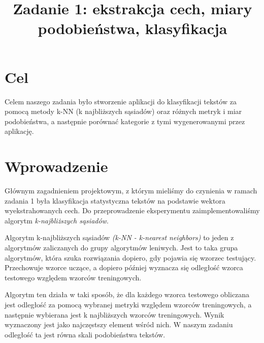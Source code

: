 \documentclass{classrep}
\author{
  \studentinfo{Radosław Grela}{216769} \and
  \studentinfo{Jakub Wąchała}{216914} 
}
\title{Zadanie 1: ekstrakcja cech, miary podobieństwa, klasyfikacja}
\begin{document}
\maketitle

\section{Cel} %
Celem naszego zadania było stworzenie aplikacji do klasyfikacji tekstów za pomocą metody k-NN (k najbliższych sąsiadów) oraz
różnych metryk i miar podobieństwa, a następnie porównać kategorie z tymi wygenerowanymi przez aplikację.

\section{Wprowadzenie} %
Głównym zagadnieniem projektowym, z którym mieliśmy do czynienia w ramach zadania 1 była klasyfikacja statystyczna tekstów na podstawie wektora wyekstrahowanych cech. Do przeprowadzenie eksperymentu zaimplementowaliśmy algorytm \textsl{k-najbliższych sąsiadów}.

Algorytm k-najbliższych sąsiadów \textsl{(k-NN - k-nearest neighbors)} to jeden z algorytmów zaliczanych do grupy algorytmów leniwych. Jest to taka grupa algorytmów, która szuka rozwiązania dopiero, gdy pojawia się wzorzec testujący. Przechowuje wzorce uczące, a dopiero później wyznacza się odległość wzorca testowego względem wzorców treningowych. \cite{leniwy} 

Algorytm ten działa w taki sposób, że dla każdego wzorca testowego obliczana jest odległość za pomocą wybranej metryki względem wzorców treningowych, a następnie wybierana jest k najbliższych wzorców treningowych. Wynik wyznaczony jest jako najczęstszy element wśród nich. W naszym zadaniu odległość ta jest równa skali podobieństwa tekstów. 
\end{document}
